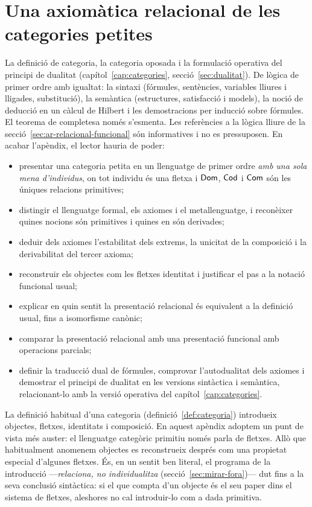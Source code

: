 \chapter[Axiomàtica relacional]{Una axiomàtica relacional de les categories petites}
\label{cap:axiomatica-relacional}

\begin{objectius}
 La definició de categoria, la categoria oposada i la formulació operativa del principi de dualitat (capítol~\ref{cap:categories}, secció~\ref{sec:dualitat}). De lògica de primer ordre amb igualtat: la sintaxi (fórmules, sentències, variables lliures i lligades, substitució), la semàntica (estructures, satisfacció i models), la noció de deducció en un càlcul de Hilbert i les demostracions per inducció sobre fórmules. El teorema de completesa només s'esmenta. Les referències a la lògica lliure de la secció~\ref{sec:ar-relacional-funcional} són informatives i no es pressuposen.
 En acabar l'apèndix, el lector hauria de poder:
\begin{itemize}
  \item presentar una categoria petita en un llenguatge de primer ordre \emph{amb una sola mena d'individus}, on tot individu és una fletxa i $\mathsf{Dom}$, $\mathsf{Cod}$ i $\mathsf{Com}$ són les úniques relacions primitives;
  \item distingir el llenguatge formal, els axiomes i el metallenguatge, i reconèixer quines nocions són primitives i quines en són derivades;
  \item deduir dels axiomes l'estabilitat dels extrems, la unicitat de la composició i la derivabilitat del tercer axioma;
  \item reconstruir els objectes com les fletxes identitat i justificar el pas a la notació funcional usual;
  \item explicar en quin sentit la presentació relacional és equivalent a la definició usual, fins a isomorfisme canònic;
  \item comparar la presentació relacional amb una presentació funcional amb operacions parcials;
  \item definir la traducció dual de fórmules, comprovar l'autodualitat dels axiomes i demostrar el principi de dualitat en les versions sintàctica i semàntica, relacionant-lo amb la versió operativa del capítol~\ref{cap:categories}.
\end{itemize}
\end{objectius}

La definició habitual d'una categoria (definició~\ref{def:categoria}) introdueix objectes, fletxes, identitats i composició. En aquest apèndix adoptem un punt de vista més auster: el llenguatge categòric primitiu només parla de fletxes. Allò que habitualment anomenem objectes es reconstrueix després com una propietat especial d'algunes fletxes. És, en un sentit ben literal, el programa de la introducció ---\emph{relaciona, no individualitza} (secció~\ref{sec:mirar-fora})--- dut fins a la seva conclusió sintàctica: si el que compta d'un objecte és el seu paper dins el sistema de fletxes, aleshores no cal introduir-lo com a dada primitiva.

